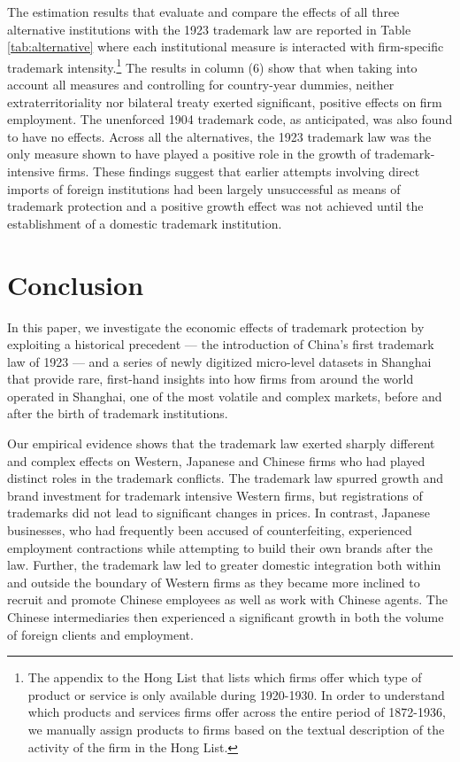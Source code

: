\documentclass[12pt]{article}
\begin{document}
The estimation results that evaluate and compare the effects of all three alternative institutions with the 1923 trademark law are reported in Table \ref{tab:alternative} where each institutional measure is interacted with firm-specific trademark intensity.\footnote{The appendix to the Hong List that lists which firms offer which type of product or service is only available during 1920-1930. In order to understand which products and services firms offer across the entire  period of 1872-1936, we manually assign products to firms based on the textual description of the activity of the firm in the Hong List.} The results in column (6) show that when taking into account all measures and controlling for country-year dummies, neither extraterritoriality nor bilateral treaty exerted significant, positive effects on firm employment. The unenforced 1904 trademark code, as anticipated, was also found to have no effects. Across all the alternatives, the 1923 trademark law was the only measure shown to have played a positive role in the growth of trademark-intensive firms. These findings suggest that earlier attempts involving direct imports of foreign institutions had been largely unsuccessful as means of trademark protection and a positive growth effect was not achieved until the establishment of a domestic trademark institution. 

\section{Conclusion} \label{sec:conclusion}

In this paper, we investigate the economic effects of trademark protection by exploiting a historical precedent — the introduction of China’s first trademark law of 1923 — and a series of newly digitized micro-level datasets in Shanghai that provide rare, first-hand insights into how firms from around the world operated in Shanghai, one of the most volatile and complex markets, before and after the birth of trademark institutions.

Our empirical evidence shows that the trademark law exerted sharply different and complex effects on Western, Japanese and Chinese firms who had played distinct roles in the trademark conflicts. The trademark law spurred growth and brand investment for trademark intensive Western firms, but registrations of trademarks did not lead to significant changes in prices. In contrast, Japanese businesses, who had frequently been accused of counterfeiting, experienced employment contractions while attempting to build their own brands after the law. Further, the trademark law led to greater domestic integration both within and outside the boundary of Western firms as they became more inclined to recruit and promote Chinese employees as well as work with Chinese agents. The Chinese intermediaries then experienced a significant growth in both the volume of foreign clients and employment. 
\end{document}

